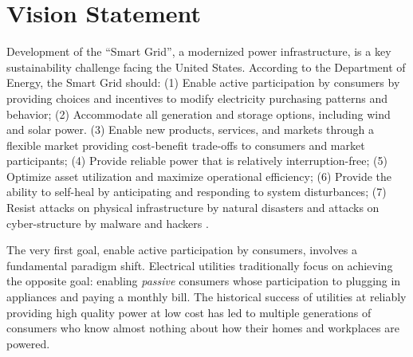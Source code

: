 
\section{Vision Statement}
\label{sec:vision}



Development of the ``Smart Grid'', a modernized power infrastructure, is a key sustainability challenge facing the United States. According to the Department of Energy, the Smart Grid should: (1) Enable active participation by consumers by providing choices and incentives to modify electricity purchasing patterns and behavior; (2) Accommodate all generation and storage options, including wind and solar power.  (3) Enable new products, services, and markets through a flexible market providing cost-benefit trade-offs to consumers and market participants; (4) Provide reliable power that is relatively interruption-free; (5) Optimize asset utilization and maximize operational efficiency; (6) Provide the ability to self-heal by anticipating and responding to system disturbances; (7) Resist attacks on physical infrastructure by natural disasters and attacks on cyber-structure by malware and hackers \cite{NETL:GridCharacteristics}.

The very first goal, enable active participation by consumers, involves a fundamental paradigm shift. Electrical utilities traditionally focus on achieving the opposite goal: enabling {\em passive} consumers whose participation to plugging in appliances and paying a monthly bill. The historical success of utilities at reliably providing high quality power at low cost has led to multiple generations of consumers who know almost nothing about how their homes and workplaces are powered.

